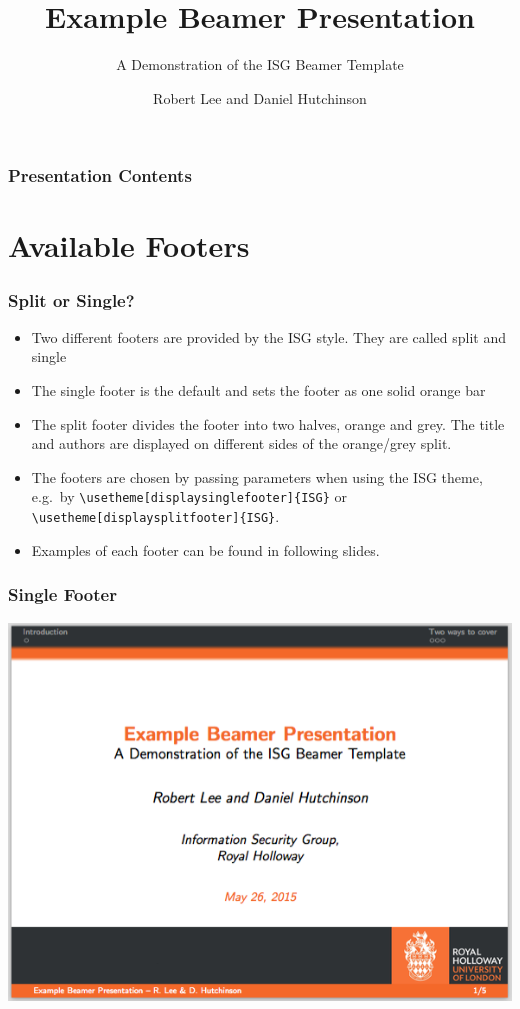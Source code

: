 \documentclass{beamer}
\title{Example Beamer Presentation}
\subtitle{A Demonstration of the ISG Beamer Template}
\author[R. Lee \& D. Hutchinson]{Robert Lee and Daniel Hutchinson}
\institute{Information Security Group,\\
Royal Holloway}
\begin{document}
\begin{frame}
\titlepage
\end{frame}

\begin{frame}\frametitle{Presentation Contents}
\tableofcontents
\end{frame}

\section{Available Footers}
\begin{frame}\frametitle{Split or Single?}
\begin{itemize}
	\item Two different footers are provided by the ISG style.  They are called split and single
	\item The single footer is the default and sets the footer as one solid orange bar
	\item The split footer divides the footer into two halves, orange and grey.  The title and authors are displayed on different sides of the orange/grey split.
	\item The footers are chosen by passing parameters when using the ISG theme, e.g.\ by \texttt{\textbackslash usetheme[displaysinglefooter]\{ISG\}} or \texttt{\textbackslash usetheme[displaysplitfooter]\{ISG\}}.
	\item Examples of each footer can be found in following slides.
\end{itemize}
\end{frame}

\begin{frame}\frametitle{Single Footer}
\begin{center}
	\includegraphics[scale=0.4]{graphics/single-footer.png}
\end{center}
\end{frame}
\end{document}
